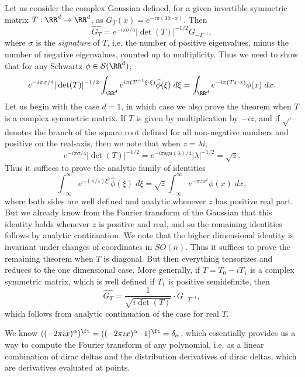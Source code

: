 \begin{example}
  Let us consider the complex Gaussian defined, for a given invertible symmetric matrix $T: \RR^d \to \RR^d$, as $G_T(x) = e^{- i \pi (Tx \cdot x)}$. Then
  \[ \widehat{G_T} = e^{- i \pi \sigma/4} |\det(T)|^{-1/2} G_{-T^{-1}}, \]
  where $\sigma$ is the \emph{signature} of $T$, i.e. the number of positive eigenvalues, minus the number of negative eigenvalues, counted up to multiplicity. Thus we need to show that for any Schwartz $\phi \in \mathcal{S}(\RR^d)$,
  \[ e^{-i \pi \sigma/4} |\det(T)|^{-1/2} \int_{\RR^d} e^{i \pi (T^{-1}\xi \cdot \xi)} \widehat{\phi}(\xi)\; d\xi = \int_{\RR^d} e^{- i \pi (Tx \cdot x)} \phi(x)\; dx. \]
  Let us begin with the case $d = 1$, in which case we also prove the theorem when $T$ is a complex symmetric matrix. If $T$ is given by multiplication by $-iz$, and if $\sqrt{\cdot}$ denotes the branch of the square root defined for all non-negative numbers and positive on the real-axis, then we note that when $z = \lambda i$,
  \[ e^{- i \pi \sigma/4} |\det(T)|^{-1/2} = e^{- i \pi \text{sgn}(\lambda)/4} |\lambda|^{-1/2} = \sqrt{z}. \]
  Thus it suffices to prove the analytic family of identities
  \[ \int_{-\infty}^\infty e^{- (\pi/z) \xi^2} \widehat{\phi}(\xi)\; d\xi = \sqrt{z} \int_{-\infty}^\infty e^{-\pi z x^2} \phi(x)\; dx, \]
  where both sides are well defined and analytic whenever $z$ has positive real part. But we already know from the Fourier transform of the Gaussian that this identity holds whenever $z$ is positive and real, and so the remaining identities follows by analytic continuation. We note that the higher dimensional identity is invariant under changes of coordinates in $SO(n)$. Thus it suffices to prove the remaining theorem when $T$ is diagonal. But then everything tensorizes and reduces to the one dimensional case. More generally, if $T = T_0 - i T_1$ is a complex symmetric matrix, which is well defined if $T_1$ is positive semidefinite, then
  \[ \widehat{G_T} = \frac{1}{\sqrt{i \det(T)}} \cdot G_{-T^{-1}}, \]
  which follows from analytic continuation of the case for real $T$.
\end{example}

\begin{example}
    We know $((-2 \pi i x)^\alpha)^\ft = ((- 2 \pi i x)^\alpha \cdot 1)^\ft = \delta_\alpha$, which essentially provides us a way to compute the Fourier transform of any polynomial, i.e. as a linear combination of dirac deltas and the distribution derivatives of dirac deltas, which are derivatives evaluated at points.
\end{example}


